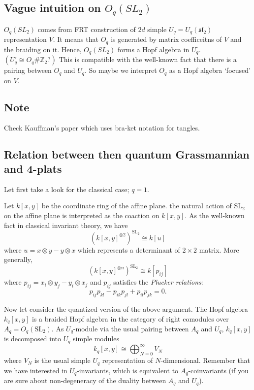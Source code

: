 \subsection*{Vague intuition on $O_q(SL_2)$}

$O_q(SL_2)$ comes from FRT construction of $2d$ simple $U_q = U_q(\mathfrak{sl}_2)$ representation $V$.
It means that $O_q$ is generated by matrix coefficeitns of $V$ and the braiding on it.
Hence, $O_q(SL_2)$ forms a Hopf algebra in $U_q^\circ$. $(U_q^\circ \cong O_q \# \mathbb{Z}_2?)$
This is compatible with the well-known fact that there is a pairing between $O_q$ and $U_q$.
So maybe we interpret $O_q$ as a Hopf algebra `focused' on $V$.


\subsection*{Note}

Check Kauffman's paper which uses bra-ket notation for tangles.


\subsection*{Relation between then quantum Grassmannian and 4-plats}

Let first take a look for the classical case; $q=1$.

Let $k[x,y]$ be the coordinate ring of the affine plane.
the natural action of $\mathrm{SL}_2$ on the affine plane is interpreted as the coaction on $k[x,y]$.
As the well-known fact in classical invariant theory, we have
\[
    \left( k[x,y]^{\otimes 2} \right)^{\mathrm{SL_2}} \cong k[u]
\]
where $u = x \otimes y - y \otimes x$ which represents a determinant of $2 \times 2$ matrix.
More generally,
\[
    \left( k[x,y]^{\otimes n} \right)^{\mathrm{SL_2}} \cong k[p_{ij}]
\]
where $p_{ij} = x_i \otimes y_j - y_i \otimes x_j$ and $p_{ij}$ satisfies the \emph{Plucker relations}:
\[
    p_{ij} p_{kl} - p_{ik} p_{jl} + p_{il} p_{jk} = 0.
\]

Now let consider the quantized version of the above argument.
The Hopf algebra $k_q[x,y]$ is a braided Hopf algebra in the category of right comodules over $A_q = O_q(\mathrm{SL}_2)$.
As $U_q$-module via the usual pairing between $A_q$ and $U_q$, $k_q[x,y]$ is decomposed into $U_q$ simple modules
\[
    k_q[x,y] \cong \bigoplus_{N=0}^\infty V_N
\]
where $V_N$ is the usual simple $U_q$ representation of $N$-dimensional.
Remember that we have interested in $U_q$-invariants, which is equivalent to $A_q$-coinvariants (if you are sure about non-degeneracy of the duality between $A_q$ and $U_q$).

